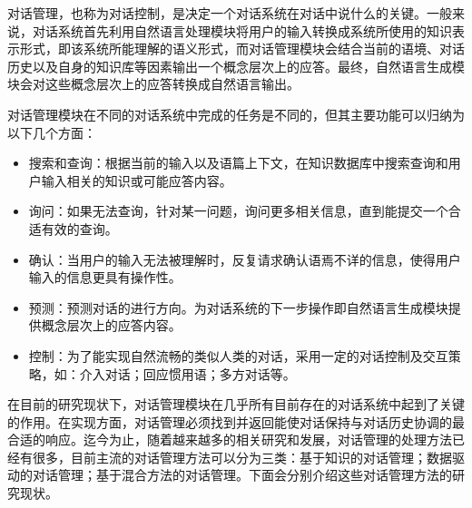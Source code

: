 对话管理，也称为对话控制，是决定一个对话系统在对话中说什么的关键。一般来说，对话系统首先利用自然语言处理模块将用户的输入转换成系统所使用的知识表示形式，即该系统所能理解的语义形式，而对话管理模块会结合当前的语境、对话历史以及自身的知识库等因素输出一个概念层次上的应答。最终，自然语言生成模块会对这些概念层次上的应答转换成自然语言输出。

对话管理模块在不同的对话系统中完成的任务是不同的，但其主要功能可以归纳为以下几个方面：

\begin{itemize}

\item 搜索和查询：根据当前的输入以及语篇上下文，在知识数据库中搜索查询和用户输入相关的知识或可能应答内容。
\item 询问：如果无法查询，针对某一问题，询问更多相关信息，直到能提交一个合适有效的查询。
\item 确认：当用户的输入无法被理解时，反复请求确认语焉不详的信息，使得用户输入的信息更具有操作性。
\item 预测：预测对话的进行方向。为对话系统的下一步操作即自然语言生成模块提供概念层次上的应答内容。
\item 控制：为了能实现自然流畅的类似人类的对话，采用一定的对话控制及交互策略，如：介入对话；回应惯用语；多方对话等。
\end{itemize}

在目前的研究现状下，对话管理模块在几乎所有目前存在的对话系统中起到了关键的作用。在实现方面，对话管理必须找到并返回能使对话保持与对话历史协调的最合适的响应。迄今为止，随着越来越多的相关研究和发展，对话管理的处理方法已经有很多，目前主流的对话管理方法可以分为三类：基于知识的对话管理；数据驱动的对话管理；基于混合方法的对话管理。下面会分别介绍这些对话管理方法的研究现状。

